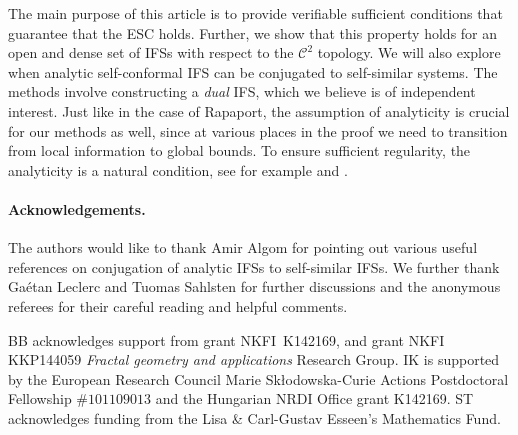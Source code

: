 \documentclass[11pt,a4paper]{article}
\theoremstyle{definition}
\theoremstyle{remark}
\newcommand{\0}{\mathbf{0}}
\numberwithin{equation}{section}
\begin{document}
The main purpose of this article is to provide verifiable sufficient conditions that guarantee that the
ESC holds. Further, we show that this property holds for an open and dense set of IFSs with respect to the
$\mathcal{C}^2$ topology. We will also explore when analytic self-conformal IFS can be conjugated to
self-similar systems.
The methods involve constructing a \emph{dual} IFS, which we believe is of independent interest. 
Just like in the case of Rapaport, the assumption of analyticity is crucial for our methods as well,
since at various places in the proof we need to transition from local information to global bounds.
To ensure sufficient regularity, the analyticity is a natural condition, see for example
\cite{AlgomEtal_NonLinHyperbolicIFS} and \cite[Example~7.7]{AngelevskaKaenmakiTroscheit2020}.


\paragraph{Acknowledgements.} The authors would like to thank Amir Algom for pointing out various
useful references on conjugation of analytic IFSs to self-similar IFSs. We further thank Ga\'etan
Leclerc and Tuomas Sahlsten for further discussions and the anonymous
referees for their careful reading and helpful comments.

BB acknowledges support from grant NKFI~K142169, and grant NKFI
KKP144059 \textit{Fractal geometry and applications} Research Group. IK is supported by the European
Research Council Marie Sk\l odowska-Curie Actions Postdoctoral Fellowship $\#101109013$ and the
Hungarian NRDI Office grant K142169. ST acknowledges funding from the Lisa \& Carl-Gustav
Esseen's Mathematics Fund.
\end{document}
